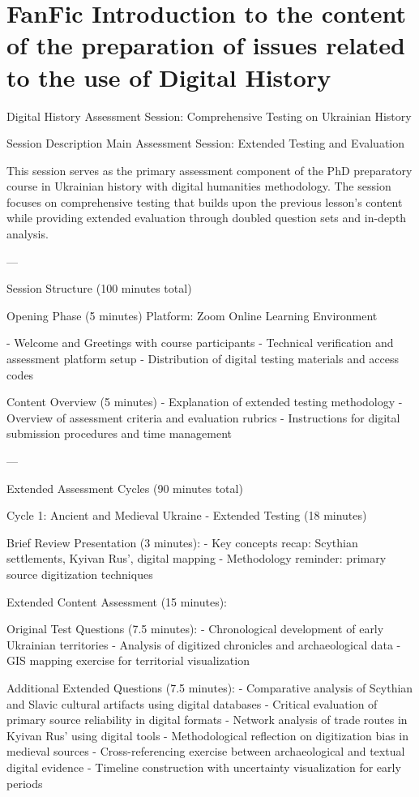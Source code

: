 \section{FanFic Introduction to the content of the preparation of issues related to the use of Digital History}

  Digital History Assessment Session: Comprehensive Testing on Ukrainian History

   Session Description
 Main Assessment Session: Extended Testing and Evaluation 

This session serves as the primary assessment component of the PhD preparatory course in Ukrainian history with digital humanities methodology. The session focuses on comprehensive testing that builds upon the previous lesson's content while providing extended evaluation through doubled question sets and in-depth analysis.

---

   Session Structure (100 minutes total)

     Opening Phase (5 minutes) 
 Platform:  Zoom Online Learning Environment

-  Welcome and Greetings  with course participants
- Technical verification and assessment platform setup
- Distribution of digital testing materials and access codes

     Content Overview (5 minutes) 
- Explanation of extended testing methodology
- Overview of assessment criteria and evaluation rubrics
- Instructions for digital submission procedures and time management

---

    Extended Assessment Cycles (90 minutes total) 

     Cycle 1: Ancient and Medieval Ukraine - Extended Testing (18 minutes) 

 Brief Review Presentation (3 minutes): 
- Key concepts recap: Scythian settlements, Kyivan Rus', digital mapping
- Methodology reminder: primary source digitization techniques

 Extended Content Assessment (15 minutes): 

 Original Test Questions (7.5 minutes): 
- Chronological development of early Ukrainian territories
- Analysis of digitized chronicles and archaeological data
- GIS mapping exercise for territorial visualization

 Additional Extended Questions (7.5 minutes): 
- Comparative analysis of Scythian and Slavic cultural artifacts using digital databases
- Critical evaluation of primary source reliability in digital formats
- Network analysis of trade routes in Kyivan Rus' using digital tools
- Methodological reflection on digitization bias in medieval sources
- Cross-referencing exercise between archaeological and textual digital evidence
- Timeline construction with uncertainty visualization for early periods

